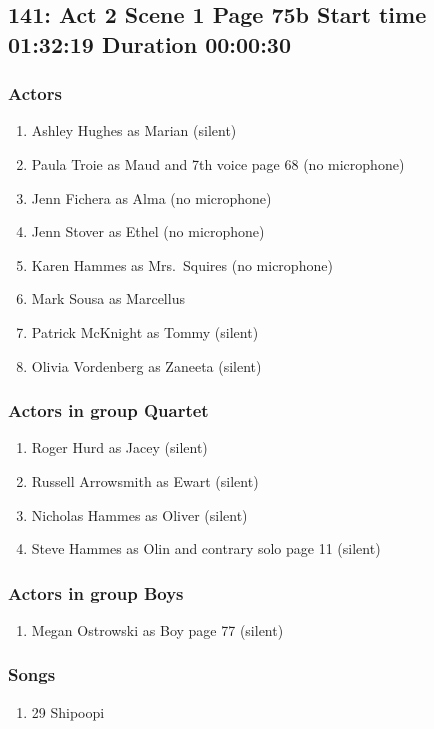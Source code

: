 \subsection{141: Act 2 Scene 1 Page 75b Start time 01:32:19 Duration 00:00:30}

\subsubsection{Actors}
\begin{enumerate}
\item Ashley Hughes as Marian (silent)
\item Paula Troie as Maud and 7th voice page 68 (no microphone)
\item Jenn Fichera as Alma (no microphone)
\item Jenn Stover as Ethel (no microphone)
\item Karen Hammes as Mrs.~Squires (no microphone)
\item Mark Sousa as Marcellus
\item Patrick McKnight as Tommy (silent)
\item Olivia Vordenberg as Zaneeta (silent)
\end{enumerate}
\subsubsection{Actors in group Quartet}
\begin{enumerate}
\item Roger Hurd as Jacey (silent)
\item Russell Arrowsmith as Ewart (silent)
\item Nicholas Hammes as Oliver (silent)
\item Steve Hammes as Olin and contrary solo page 11 (silent)
\end{enumerate}
\subsubsection{Actors in group Boys}
\begin{enumerate}
\item Megan Ostrowski as Boy page 77 (silent)
\end{enumerate}

\subsubsection{Songs}
\begin{enumerate}
\item 29 Shipoopi
\end{enumerate}

